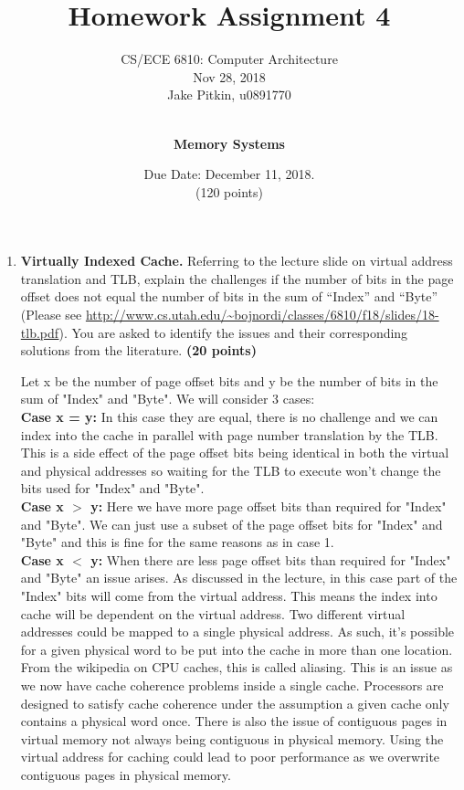 \documentclass[a4paper, 11pt]{exam}
\title{Homework Assignment 4}
\subtitle{CS/ECE 6810: Computer Architecture \\
Nov 28, 2018\\
Jake Pitkin, u0891770}
\author{ \\
\textbf{Memory Systems}}
\date{Due Date: December 11, 2018.\\
(120 points)}
\begin{document}
\maketitle

\begin{enumerate}

\item \textbf {Virtually Indexed Cache.}
Referring to the lecture slide on virtual address translation and TLB, explain the
challenges if the number of bits in the page offset does not equal the number of
bits in the sum of ``Index'' and ``Byte'' (Please see \url{http://www.cs.utah.edu/~bojnordi/classes/6810/f18/slides/18-tlb.pdf}). 
You are asked to identify the issues and their corresponding solutions from the literature.
\textbf{(20 points)}

Let x be the number of page offset bits and y be the number of bits in the sum of "Index" and "Byte". We will consider 3 cases: \\

\textbf{Case x = y:} In this case they are equal, there is no challenge and we can index into the cache in parallel with page number translation by the TLB. This is a side effect of the page offset bits being identical in both the virtual and physical addresses so waiting for the TLB to execute won't change the bits used for "Index" and "Byte". \\

\textbf{Case x $>$ y:} Here we have more page offset bits than required for "Index" and "Byte". We can just use a subset of the page offset bits for "Index" and "Byte" and this is fine for the same reasons as in case 1. \\

\textbf{Case x $<$ y:} When there are less page offset bits than required for "Index" and "Byte" an issue arises. As discussed in the lecture, in this case part of the "Index" bits will come from the virtual address. This means the index into cache will be dependent on the virtual address. Two different virtual addresses could be mapped to a single physical address. As such, it's possible for a given physical word to be put into the cache in more than one location. \\

From the wikipedia on CPU caches, this is called aliasing. This is an issue as we now have cache coherence problems inside a single cache. Processors are designed to satisfy cache coherence under the assumption a given cache only contains a physical word once. There is also the issue of contiguous pages in virtual memory not always being contiguous in physical memory. Using the virtual address for caching could lead to poor performance as we overwrite contiguous pages in physical memory.\\


\end{enumerate}
\end{document}
